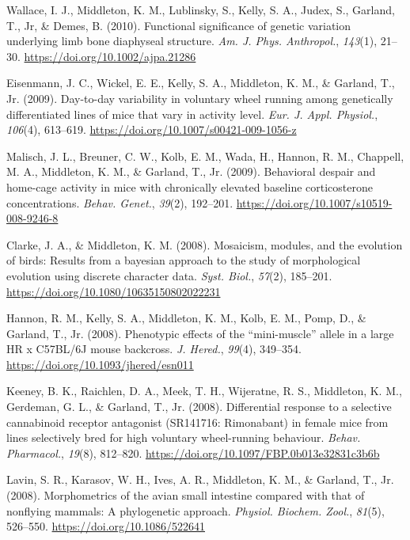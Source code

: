 \documentclass[11pt, a4paper]{awesome-cv}
\begin{document}
\leavevmode\hypertarget{ref-wallace_functional_2010}{}%
Wallace, I. J., Middleton, K. M., Lublinsky, S., Kelly, S. A., Judex,
S., Garland, T., Jr, \& Demes, B. (2010). Functional significance of
genetic variation underlying limb bone diaphyseal structure. \emph{Am.
J. Phys. Anthropol.}, \emph{143}(1), 21--30.
\url{https://doi.org/10.1002/ajpa.21286}

\leavevmode\hypertarget{ref-eisenmann_day_2009}{}%
Eisenmann, J. C., Wickel, E. E., Kelly, S. A., Middleton, K. M., \&
Garland, T., Jr. (2009). Day-to-day variability in voluntary wheel
running among genetically differentiated lines of mice that vary in
activity level. \emph{Eur. J. Appl. Physiol.}, \emph{106}(4), 613--619.
\url{https://doi.org/10.1007/s00421-009-1056-z}

\leavevmode\hypertarget{ref-malisch_behavioral_2009}{}%
Malisch, J. L., Breuner, C. W., Kolb, E. M., Wada, H., Hannon, R. M.,
Chappell, M. A., Middleton, K. M., \& Garland, T., Jr. (2009).
Behavioral despair and home-cage activity in mice with chronically
elevated baseline corticosterone concentrations. \emph{Behav. Genet.},
\emph{39}(2), 192--201. \url{https://doi.org/10.1007/s10519-008-9246-8}

\leavevmode\hypertarget{ref-clarke_mosaicism_2008}{}%
Clarke, J. A., \& Middleton, K. M. (2008). Mosaicism, modules, and the
evolution of birds: Results from a bayesian approach to the study of
morphological evolution using discrete character data. \emph{Syst.
Biol.}, \emph{57}(2), 185--201.
\url{https://doi.org/10.1080/10635150802022231}

\leavevmode\hypertarget{ref-hannon_phenotypic_2008a}{}%
Hannon, R. M., Kelly, S. A., Middleton, K. M., Kolb, E. M., Pomp, D., \&
Garland, T., Jr. (2008). Phenotypic effects of the ``mini-muscle''
allele in a large HR x C57BL/6J mouse backcross. \emph{J. Hered.},
\emph{99}(4), 349--354. \url{https://doi.org/10.1093/jhered/esn011}

\leavevmode\hypertarget{ref-keeney_differential_2008}{}%
Keeney, B. K., Raichlen, D. A., Meek, T. H., Wijeratne, R. S.,
Middleton, K. M., Gerdeman, G. L., \& Garland, T., Jr. (2008).
Differential response to a selective cannabinoid receptor antagonist
(SR141716: Rimonabant) in female mice from lines selectively bred for
high voluntary wheel-running behaviour. \emph{Behav. Pharmacol.},
\emph{19}(8), 812--820.
\url{https://doi.org/10.1097/FBP.0b013e32831c3b6b}

\leavevmode\hypertarget{ref-lavin_morphometrics_2008}{}%
Lavin, S. R., Karasov, W. H., Ives, A. R., Middleton, K. M., \& Garland,
T., Jr. (2008). Morphometrics of the avian small intestine compared with
that of nonflying mammals: A phylogenetic approach. \emph{Physiol.
Biochem. Zool.}, \emph{81}(5), 526--550.
\url{https://doi.org/10.1086/522641}
\end{document}
